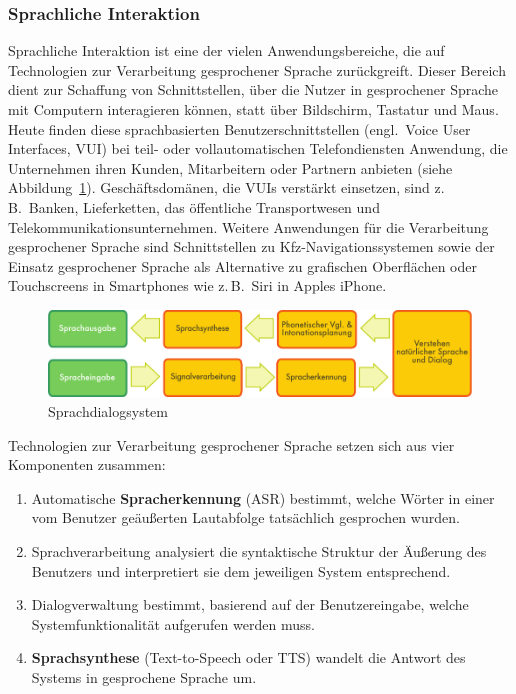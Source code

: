 \documentclass[]{../../metanetpaper}
\begin{document}
\begin{multicols}{2}
\subsubsection{Sprachliche Interaktion}

Sprachliche Interaktion ist eine der vielen Anwendungsbereiche, die auf Technologien zur Verarbeitung gesprochener Sprache zurückgreift. Dieser Bereich dient zur Schaffung von Schnittstellen, über die Nutzer in gesprochener Sprache mit Computern interagieren können, statt über Bildschirm, Tastatur und Maus. Heute finden diese sprachbasierten Benutzerschnittstellen (engl.~Voice User Interfaces, VUI) bei teil- oder vollautomatischen Telefondiensten Anwendung, die Unternehmen ihren Kunden, Mitarbeitern oder Partnern anbieten (siehe Abbildung~\ref{fig:dialoguearch_de}). Geschäftsdomänen, die VUIs verstärkt einsetzen, sind z.\,B.~Banken, Lieferketten, das öffentliche Transportwesen und Telekommunikationsunternehmen. Weitere Anwendungen für die Verarbeitung gesprochener Sprache sind Schnittstellen zu Kfz-Navigationssystemen sowie der Einsatz gesprochener Sprache als Alternative zu grafischen Oberflächen oder Touchscreens in Smartphones wie z.\,B.~Siri in Apples iPhone.


\begin{figure}[htb]
  \vspace{-9mm}
  \center  \includegraphics[width=\textwidth]{../_media/german/simple_speech-based_dialogue_architecture}
  \center
  \caption{Sprachdialogsystem}
  \label{fig:dialoguearch_de}
\end{figure}

Technologien zur Verarbeitung gesprochener Sprache setzen sich aus vier Komponenten zusammen:

\begin{enumerate}
\item Automatische \textbf{Spracherkennung} (ASR) bestimmt, welche Wörter in einer vom Benutzer geäußerten Lautabfolge tatsächlich gesprochen wurden.
\item Sprachverarbeitung analysiert die syntaktische Struktur der Äußerung des Benutzers und interpretiert sie dem jeweiligen System entsprechend.
\item Dialogverwaltung bestimmt, basierend auf der Benutzereingabe, welche Systemfunktionalität aufgerufen werden muss.
\item \textbf{Sprachsynthese} (Text-to-Speech oder TTS) wandelt die Antwort des Systems in gesprochene Sprache um.
\end{enumerate}


\end{multicols}
\end{document}
